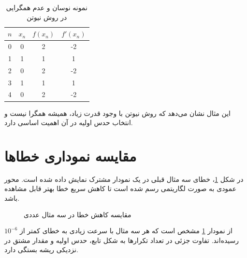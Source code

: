 \begin{table}[H]
\centering
\caption{نمونه نوسان و عدم همگرایی در روش نیوتن}
\label{tab:failure}
\renewcommand{\arraystretch}{1.4}
\begin{tabular}{c c c c}
\toprule[1.3pt]
$n$ & $x_n$ & $f(x_n)$ & $f'(x_n)$ \\
\midrule[1pt]
0 & 0 & 2 & -2 \\
1 & 1 & 1 & 1 \\
2 & 0 & 2 & -2 \\
3 & 1 & 1 & 1 \\
4 & 0 & 2 & -2 \\
\bottomrule[1.3pt]
\end{tabular}
\end{table}

این مثال نشان می‌دهد که روش نیوتن با وجود قدرت زیاد، همیشه همگرا نیست و انتخاب حدس اولیه در آن اهمیت اساسی دارد.

\section{مقایسه نموداری خطاها}

در شکل \ref{fig:error-comparison}، خطای سه مثال قبلی در یک نمودار مشترک نمایش داده شده است. محور عمودی به صورت لگاریتمی رسم شده است تا کاهش سریع خطا بهتر قابل مشاهده باشد.

\begin{figure}[H]
\centering
{}
\caption{مقایسه کاهش خطا در سه مثال عددی}
\label{fig:error-comparison}
\end{figure}

از نمودار \ref{fig:error-comparison} مشخص است که هر سه مثال با سرعت زیادی به خطای کمتر از $10^{-6}$ رسیده‌اند. تفاوت جزئی در تعداد تکرارها به شکل تابع، حدس اولیه و مقدار مشتق در نزدیکی ریشه بستگی دارد.

